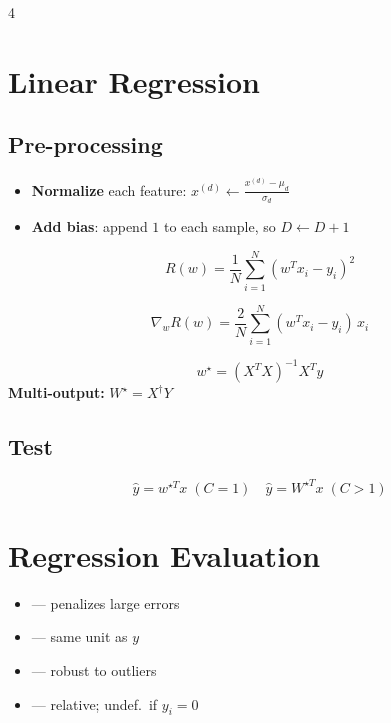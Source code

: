 \documentclass[8pt,a4paper,landscape]{extarticle}
\begin{document}
\begin{multicols*}{4}
\section{Linear Regression}

\subsection{Pre-processing}
\begin{itemize}
  \item \textbf{Normalize} each feature: $x^{(d)} \leftarrow \frac{x^{(d)}-\mu_d}{\sigma_d}$
  \item \textbf{Add bias}: append $1$ to each sample, so $D \leftarrow D+1$
\end{itemize}

\begin{defn}[title=MSE Risk]
\[ R(w) = \frac{1}{N}\sum_{i=1}^{N}(w^T x_i - y_i)^2 \]
\end{defn}

\begin{prop}[title=Gradient]
\[ \nabla_w R(w) = \frac{2}{N}\sum_{i=1}^{N}(w^T x_i - y_i)\,x_i \]
\end{prop}

\begin{thm}[title=Closed-Form Solution]
\[ w^\star = (X^T X)^{-1} X^T y \]
\textbf{Multi-output:} $W^\star = X^\dagger Y$
\end{thm}

\subsection{Test}
\[ \hat{y} = w^{\star T} x \;(C{=}1) \quad \hat{y} = W^{\star T} x \;(C{>}1) \]

\section{Regression Evaluation}

\begin{itemize}
  \item {} — penalizes large errors
  \item {} — same unit as $y$
  \item {} — robust to outliers
  \item {} — relative; undef.\ if $y_i=0$
\end{itemize}


\end{multicols*}
\end{document}
